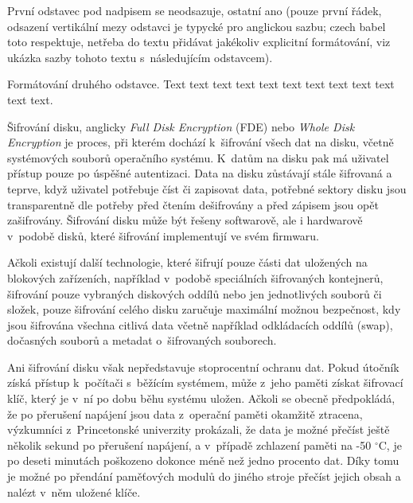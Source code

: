 
První odstavec pod nadpisem se neodsazuje, ostatní ano (pouze první řádek, odsazení vertikální mezy odstavci je typycké pro anglickou sazbu; czech babel toto respektuje, netřeba do textu přidávat jakékoliv explicitní formátování, viz ukázka sazby tohoto textu s~následujícím odstavcem).

Formátování druhého odstavce. Text text text text text text text text text text text text.



\label{sec:fde}

Šifrování disku, anglicky \emph{Full Disk Encryption} (FDE) nebo \emph{Whole Disk Encryption} je proces, při kterém dochází k~šifrování všech dat na disku, včetně systémových souborů operačního systému. K~datům na disku pak má uživatel přístup pouze po úspěšné autentizaci. Data na disku zůstávají stále šifrovaná a teprve, když uživatel potřebuje číst či zapisovat data, potřebné sektory disku jsou transparentně dle potřeby před čtením dešifrovány a před zápisem jsou opět zašifrovány. Šifrování disku může být řešeny softwarově, ale i hardwarově v~podobě disků, které šifrování implementují ve svém firmwaru.

Ačkoli existují další technologie, které šifrují pouze části dat uložených na blokových zařízeních, například v~podobě speciálních šifrovaných kontejnerů, šifrování pouze vybraných diskových oddílů nebo jen jednotlivých souborů či složek, pouze šifrování celého disku zaručuje maximální možnou bezpečnost, kdy jsou šifrována všechna citlivá data včetně například odkládacích oddílů (swap), dočasných souborů a metadat o~ši\-fro\-va\-ných souborech.\cite{Scarfone2007}

Ani šifrování disku však nepředstavuje stoprocentní ochranu dat. Pokud útočník získá přístup k~počítači s~běžícím systémem, může z~jeho paměti získat šifrovací klíč, který je v~ní po dobu běhu systému uložen. Ačkoli se obecně předpokládá, že po přerušení napájení jsou data z~operační paměti okamžitě ztracena, výzkumníci z~Princetonské univerzity prokázali, že data je možné přečíst ještě několik sekund po přerušení napájení, a v~případě zchlazení paměti na -50 $^{\circ}$C, je po deseti minutách poškozeno dokonce méně než jedno procento dat. Díky tomu je možné po přendání paměťových modulů do jiného stroje přečíst jejich obsah a nalézt v~něm uložené klíče.\cite{Halderman20090501}

